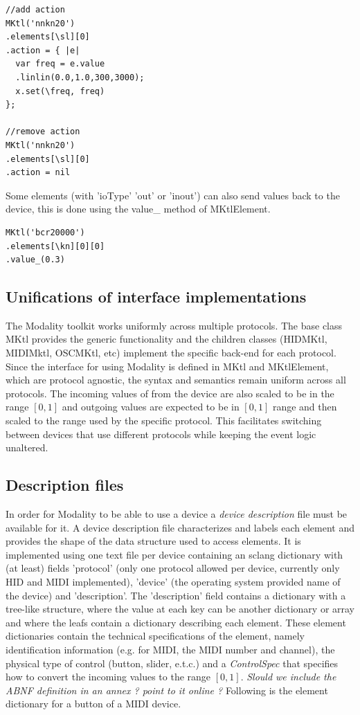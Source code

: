 \documentclass{article}
\begin{document}
\begin{Verbatim}
//add action
MKtl('nnkn20')
.elements[\sl][0]
.action = { |e|
  var freq = e.value
  .linlin(0.0,1.0,300,3000);
  x.set(\freq, freq)
};

//remove action
MKtl('nnkn20')
.elements[\sl][0]
.action = nil
\end{Verbatim}

Some elements (with 'ioType' 'out' or 'inout') can also send values back to the device, this is done using the value\_ method of MKtlElement.

\begin{Verbatim}
MKtl('bcr20000')
.elements[\kn][0][0]
.value_(0.3)
\end{Verbatim}

\subsection{Unifications of interface implementations}
\label{sub:unifications_of_interface_implementations}

The Modality toolkit works uniformly across multiple protocols. The base class MKtl provides the generic functionality and the children classes (HIDMKtl, MIDIMktl, OSCMKtl, etc) implement the specific back-end for each protocol. Since the interface for using Modality is defined in MKtl and MKtlElement, which are protocol agnostic, the syntax and semantics remain uniform across all protocols. The incoming values of from the device are also scaled to be in the range $[0,1]$ and outgoing values are expected to be in $[0,1]$ range and then scaled to the range used by the specific protocol.  This facilitates switching between devices that use different protocols while keeping the event logic unaltered.

\subsection{Description files}
\label{sub:descriptions_files}

In order for Modality to be able to use a device a \textit{device description} file must be available for it.  A device description file characterizes and labels each element and provides the shape of the data structure used to access elements. It is implemented using one text file per device containing an sclang dictionary with (at least) fields 'protocol' (only one protocol allowed per device, currently only HID and MIDI implemented), 'device' (the operating system provided name of the device) and 'description'. The 'description' field contains a dictionary with a tree-like structure, where the value at each key can be another dictionary or array and where the leafs contain a dictionary describing each element. These element dictionaries contain the technical specifications of the element, namely identification information (e.g. for MIDI, the MIDI number and channel), the physical type of control (button, slider, e.t.c.) and a \textit{ControlSpec} that specifies how to convert the incoming values to the range $[0,1]$.   \emph{Slould we include the ABNF definition  in an annex ? point to it online ?} Following is the element dictionary for a button of a MIDI device.
\end{document}
